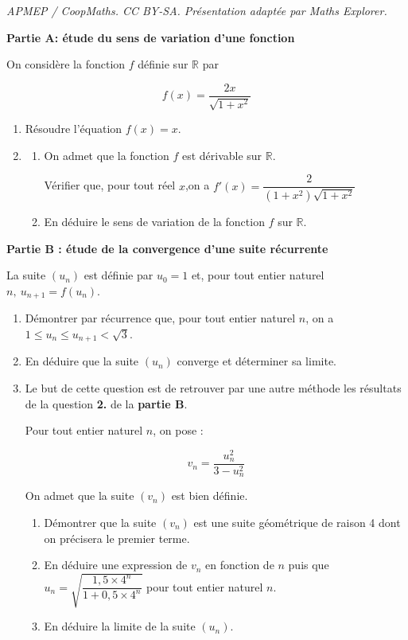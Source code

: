 \documentclass[10pt]{article}
\providecommand{\R}{\mathbb{R}}
\begin{document}
\noindent\textit{APMEP / CoopMaths. CC BY-SA. Présentation adaptée par Maths Explorer.}\par\medskip
\textbf{Partie A: étude du sens de variation d'une fonction}

\medskip

On considère la fonction $f$ définie sur $\R$ par 

\[f(x) = \dfrac{2x}{\sqrt{1 + x^2}}\]

\begin{enumerate}
\item Résoudre l'équation $f(x) = x$.
\item
	\begin{enumerate}
		\item On admet que la fonction $f$ est dérivable sur $\R$.
		
Vérifier que, pour tout réel $x$,on a $f'(x) = \dfrac{2}{(1+x^2)\sqrt{1 + x^2}}$
		\item En déduire le sens de variation de la fonction $f$ sur $\R$.
	\end{enumerate}
\end{enumerate}

\medskip

\textbf{Partie B : étude de la convergence d'une suite récurrente}

\medskip

La suite $(u_n)$ est définie par $u_0 = 1$ et, pour tout entier naturel $n,\: u_{n+1} = f(u_n)$.

\medskip

\begin{enumerate}
\item Démontrer par récurrence que, pour tout entier naturel $n$, on a $1 \leqslant u_n \leqslant u_{n+1} < \sqrt 3$.
\item En déduire que la suite $(u_n)$ converge et déterminer sa limite.
\item Le but de cette question est de retrouver par une autre méthode les résultats de la
question \textbf{2.} de la \textbf{partie B}.

Pour tout entier naturel $n$, on pose :

\[v_n = \dfrac{u_n^2}{3 - u_n^2}\]

On admet que la suite $(v_n)$ est bien définie.
	\begin{enumerate}
		\item Démontrer que la suite $(v_n)$ est une suite géométrique de raison 4 dont on précisera le premier terme.
		\item En déduire une expression de $v_n$ en fonction de $n$ puis que $u_n = \sqrt{\dfrac{1,5 \times 4^n}{1 + 0,5 \times 4^n}}$ pour tout entier naturel $n$.
		\item En déduire la limite de la suite $(u_n)$.
	\end{enumerate}
\end{enumerate}
\end{document}
